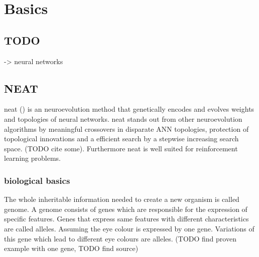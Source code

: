 
\chapter{Basics}\label{Basics}
\section{TODO}
-> neural networks

\section{NEAT}\label{NEAT} %
\Gls{neat} (\cite{NEAT}) is an neuroevolution method that genetically encodes and evolves weights and topologies of neural networks. \gls{neat} stands out from other neuroevolution algorithms by meaningful crossovers in disparate ANN topologies, protection of topological innovations and a efficient search by a stepwise increasing search space. (TODO cite some). Furthermore \gls{neat} is well suited for reinforcement learning problems. 
\subsection{biological basics} 
The whole inheritable information needed to create a new organism is called genome. A genome consists of genes which are responsible for the expression of specific features. Genes that express same features with  different characteristics are called alleles. Assuming the eye colour is expressed by one gene.  Variations of this gene which lead to different eye colours are alleles. (TODO find proven example with one gene, TODO find source)
